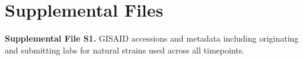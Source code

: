 \section{Supplemental Files}

\textbf{Supplemental File S1.} GISAID accessions and metadata including originating and submitting labs for natural strains used across all timepoints.

